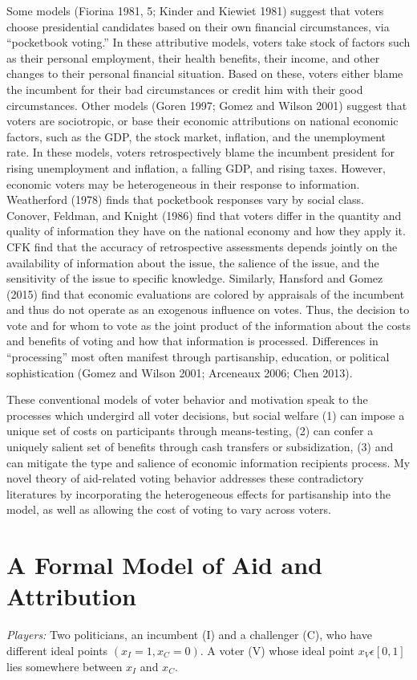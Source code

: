 \documentclass[12pt]{paper}
\begin{document}
Some models (Fiorina 1981, 5; Kinder and Kiewiet 1981) suggest that voters choose presidential candidates based on their own financial circumstances, via “pocketbook voting.” In these attributive models, voters take stock of factors such as their personal employment, their health benefits, their income, and other changes to their personal financial situation. Based on these, voters either blame the incumbent for their bad circumstances or credit him with their good circumstances. Other models (Goren 1997; Gomez and Wilson 2001) suggest that voters are sociotropic, or base their economic attributions on national economic factors, such as the GDP, the stock market, inflation, and the unemployment rate. In these models, voters retrospectively blame the incumbent president for rising unemployment and inflation, a falling GDP, and rising taxes.  However, economic voters may be heterogeneous in their response to information. Weatherford (1978) finds that pocketbook responses vary by social class. Conover, Feldman, and Knight  (1986) find that voters differ in the quantity and quality of information they have on the national economy and how they apply it. CFK find that the accuracy of retrospective assessments depends jointly on the availability of information about the issue, the salience of the issue, and the sensitivity of the issue to specific knowledge. Similarly, Hansford and Gomez (2015) find that economic evaluations are colored by appraisals of the incumbent and thus do not operate as an exogenous influence on votes. Thus, the decision to vote and for whom to vote as the joint product of the information about the costs and benefits of voting and how that information is processed. Differences in “processing” most often manifest through partisanship, education, or political sophistication (Gomez and Wilson 2001; Arceneaux 2006; Chen 2013). 

These conventional models of voter behavior and motivation speak to the processes which undergird all voter decisions, but social welfare (1) can impose a unique set of costs on participants through means-testing, (2) can confer a uniquely salient set of benefits through cash transfers or subsidization, (3) and can mitigate the type and salience of economic information recipients process. My novel theory of aid-related voting behavior addresses these contradictory literatures by incorporating the heterogeneous effects for partisanship into the model, as well as allowing the cost of voting to vary across voters.

\section{A Formal Model of Aid and Attribution}
\emph{Players:} Two politicians, an incumbent (I) and a challenger (C), who have different ideal points $(x_I=1, x_C=0)$. A voter (V) whose ideal point $x_V \epsilon [0,1]$ lies somewhere between $x_I$ and $x_C.$
\end{document}
